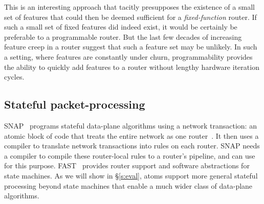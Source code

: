 This is an interesting approach that tacitly presupposes the existence of a
small set of features that could then be deemed sufficient for a {\em
fixed-function} router. If such a small set of fixed features did indeed exist,
it would be certainly be preferable to a programmable router. But the last few
decades of increasing feature creep in a router suggest that such a feature set
may be unlikely. In such a setting, where features are constantly under churn,
programmability provides the ability to quickly add features to a router
without lengthy hardware iteration cycles.

\subsection{Stateful packet-processing}
SNAP~\cite{snap} programs stateful data-plane algorithms using a network
transaction: an atomic block of code that treats the entire network as one
router~\cite{onebigswitch}. It then uses a compiler to translate network
transactions into rules on each router. SNAP needs a compiler to compile these
router-local rules to a router's pipeline, and can use \pktlanguage for this
purpose. FAST~\cite{fast} provides router support and software abstractions for
state machines. As we will show in \S\ref{s:eval}, atoms support more general
stateful processing beyond state machines that enable a much wider class of
data-plane algorithms.


